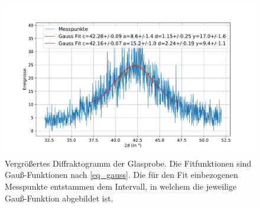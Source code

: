 \documentclass[
	a4paper,
	12pt,
	pagesize,
	ngerman
]{scrartcl}
\begin{document}
	\begin{figure}[H]
			\includegraphics[width=\linewidth]{img/XRD_Glas_42_10.pdf}
			\caption{
				Vergrößertes Diffraktogramm der Glasprobe.
				Die Fitfunktionen sind Gauß-Funktionen nach \cref{eq_gauss}.
				Die für den Fit einbezogenen Messpunkte entstammen dem Intervall, in welchem die jeweilige Gauß-Funktion abgebildet ist.
				}
			\label{fig_xrd_glas_1}
	\end{figure}
\end{document}
